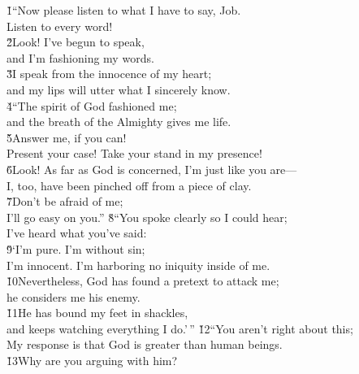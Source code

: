 \begin{poetry}
\poeml {}
\v{1}``Now please listen to what I have to say, Job. \\
\poemll    Listen to every word! \\
\poeml \v{2}Look! I've begun to speak, \\
\poemll    and I'm fashioning my words. \\
\poeml \v{3}I speak from the innocence of my heart; \\
\poemll    and my lips will utter what I sincerely know. \\
\poeml \v{4}``The spirit of God fashioned me; \\
\poemll    and the breath of the Almighty gives me life. \\
\poeml \v{5}Answer me, if you can! \\
\poemll    Present your case! Take your stand in my presence! \\
\poeml \v{6}Look! As far as God is concerned, I'm just like you are--- \\
\poemll    I, too, have been pinched off from a piece of clay. \\
\poeml \v{7}Don't be afraid of me; \\
\poemll    I'll go easy on you.''
\poeml \v{8}``You spoke clearly so I could hear; \\
\poemll    I've heard what you've said: \\
\poeml \v{9}`I'm pure. I'm without sin; \\
\poemll    I'm innocent. I'm harboring no iniquity inside of me. \\
\poeml \v{10}Nevertheless, God has found a pretext to attack me; \\
\poemll    he considers me his enemy. \\
\poeml \v{11}He has bound my feet in shackles, \\
\poemll    and keeps watching everything I do.'\,''
\poeml \v{12}``You aren't right about this; \\
\poemll    My response is that God is greater than human beings. \\
\poeml \v{13}Why are you arguing with him? \\

\end{poetry}
